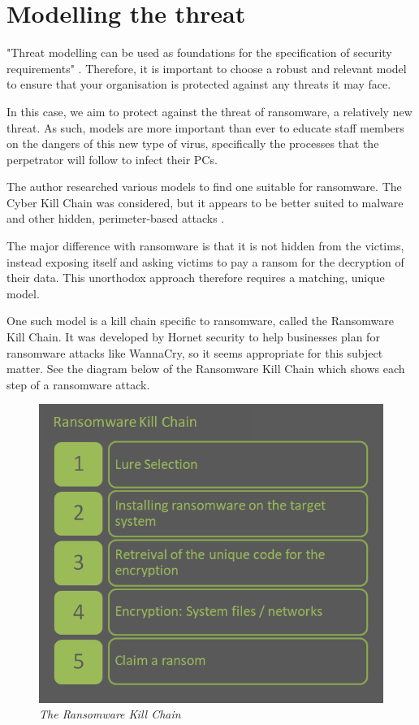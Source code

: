 \documentclass[12pt,a4paper]{article}
\begin{document}
\section{Modelling the threat}

"Threat modelling can be
used as foundations for the specification of security requirements" \cite{modellingImportant}. Therefore, it is important to choose a robust and relevant model to ensure that your organisation is protected against any threats it may face.

In this case, we aim to protect against the threat of ransomware, a relatively new threat. As such, models are more important than ever to educate staff members on the dangers of this new type of virus, specifically the processes that the perpetrator will follow to infect their PCs.

The author researched various models to find one suitable for ransomware. The Cyber Kill Chain was considered, but it appears to be better suited to malware and other hidden, perimeter-based attacks \cite{AttackCKC}.

The major difference with ransomware is that it is not hidden from the victims, instead exposing itself and asking victims to pay a ransom for the decryption of their data. This unorthodox approach therefore requires a matching, unique model.

One such model is a kill chain specific to ransomware, called the Ransomware Kill Chain. It was developed by Hornet security \cite{Hornet} to help businesses plan for ransomware attacks like WannaCry, so it seems appropriate for this subject matter. See the diagram below of the Ransomware Kill Chain which shows each step of a ransomware attack.
\begin{figure}
\centering
\includegraphics[width=1\textwidth]{RKCCustom.PNG}
\caption{\textit{The Ransomware Kill Chain}}
\end{figure}
\end{document}
